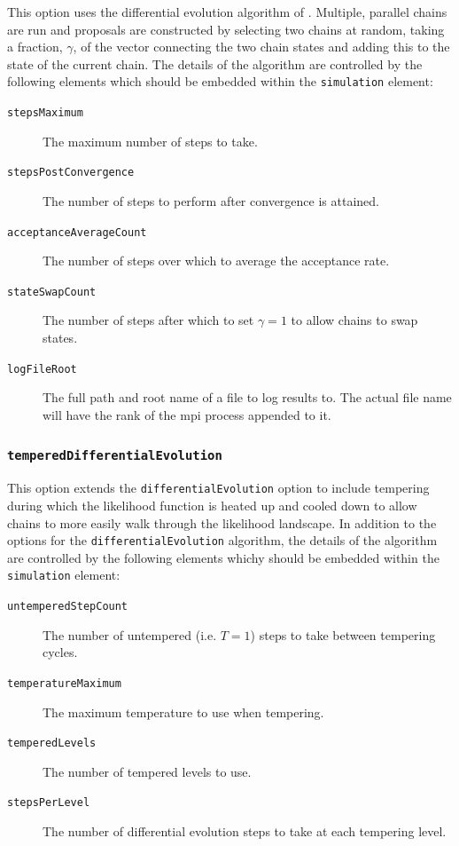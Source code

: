 This option uses the differential evolution algorithm of \cite{terr_braak_markov_2006}. Multiple, parallel chains are run and proposals are constructed by selecting two chains at random, taking a fraction, $\gamma$, of the vector connecting the two chain states and adding this to the state of the current chain. The details of the algorithm are controlled by the following elements which should be embedded within the {\tt simulation} element:
\begin{description}
\item[{\tt stepsMaximum}] The maximum number of steps to take.
\item[{\tt stepsPostConvergence}] The number of steps to perform after convergence is attained.
\item[{\tt acceptanceAverageCount}] The number of steps over which to average the acceptance rate.
\item[{\tt stateSwapCount}] The number of steps after which to set $\gamma=1$ to allow chains to swap states.
\item[{\tt logFileRoot}] The full path and root name of a file to log results to. The actual file name will have the rank of the \gls{mpi} process appended to it.
\end{description}

\subsubsection{{\tt temperedDifferentialEvolution}}

This option extends the {\tt differentialEvolution} option to include tempering during which the likelihood function is heated up and cooled down to allow chains to more easily walk through the likelihood landscape. In addition to the options for the {\tt differentialEvolution} algorithm, the details of the algorithm are controlled by the following elements whichy should be embedded within the {\tt simulation} element:
\begin{description}
\item[{\tt untemperedStepCount}] The number of untempered (i.e. $T=1$) steps to take between tempering cycles.
\item[{\tt temperatureMaximum}] The maximum temperature to use when tempering.
\item[{\tt temperedLevels}] The number of tempered levels to use.
\item[{\tt stepsPerLevel}] The number of differential evolution steps to take at each tempering level.
\end{description}

